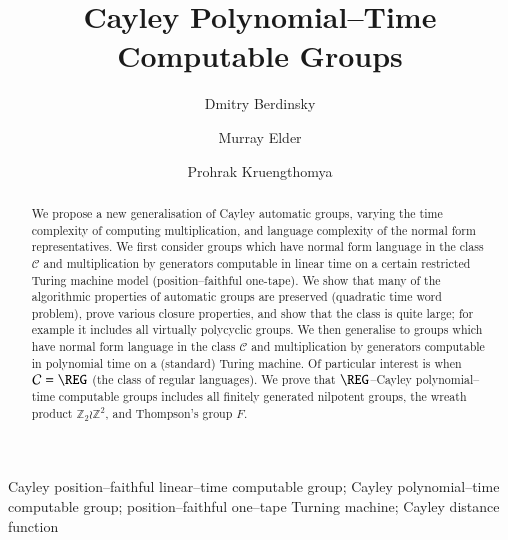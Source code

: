 \documentclass[article,12pt]{elsarticle}
\newcommand\distfun{Cayley distance function}
\begin{document}

\begin{frontmatter}

\title{Cayley Polynomial--Time Computable Groups}



\author[label1,label2]{Dmitry Berdinsky}

\author[label3]{Murray Elder }


\author[label1,label2]{Prohrak Kruengthomya}

\address[label1]{Department of Mathematics, Faculty of Science,
 Mahidol University, Bangkok, 10400, Thailand}

\address[label2]{Centre of Excellence in Mathematics, Commission on Higher Education, Bangkok, 10400, Thailand}

\address[label3]{School of Mathematical and Physical Sciences, University of Technology Sydney, Ultimo, NSW 2007, Australia}





\begin{abstract}

We propose a new generalisation of Cayley automatic groups, varying the time complexity of computing multiplication, and language complexity of the normal form representatives.
We first consider groups which have normal form language in the class $\mathcal C$ and multiplication by generators computable in linear time on a certain restricted Turing machine model (position--faithful one-tape).
We show that many of the algorithmic properties of automatic groups are preserved (quadratic time word problem), prove various closure properties, and show that the class is quite large; for example it includes all virtually polycyclic groups.
We then generalise to  groups which have normal form language in the class $\mathcal C$ and multiplication by generators computable in polynomial time on a (standard) Turing machine. Of particular interest is when $\mathcal C=\REG$  (the class of regular languages). We prove that 
$\REG$–Cayley polynomial–time
computable groups includes all finitely generated nilpotent groups, the wreath
product $\mathbb Z_2 \wr \mathbb Z^2$, and Thompson’s group $F$.



\end{abstract}

\begin{keyword}
Cayley position--faithful linear--time computable 
group;  
Cayley polynomial–time computable group;
position--faithful one--tape Turning machine;
\distfun\
\end{keyword}


\end{frontmatter}
\end{document}
